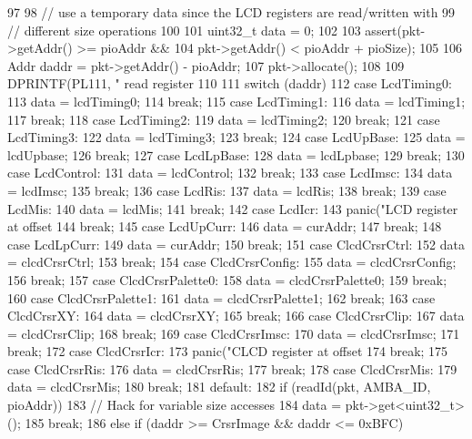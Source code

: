 \begin{DoxyCode}
97 {
98     // use a temporary data since the LCD registers are read/written with
99     // different size operations
100 
101     uint32_t data = 0;
102 
103     assert(pkt->getAddr() >= pioAddr &&
104            pkt->getAddr() < pioAddr + pioSize);
105 
106     Addr daddr = pkt->getAddr() - pioAddr;
107     pkt->allocate();
108 
109     DPRINTF(PL111, " read register %
110 
111     switch (daddr) {
112       case LcdTiming0:
113         data = lcdTiming0;
114         break;
115       case LcdTiming1:
116         data = lcdTiming1;
117         break;
118       case LcdTiming2:
119         data = lcdTiming2;
120         break;
121       case LcdTiming3:
122         data = lcdTiming3;
123         break;
124       case LcdUpBase:
125         data = lcdUpbase;
126         break;
127       case LcdLpBase:
128         data = lcdLpbase;
129         break;
130       case LcdControl:
131         data = lcdControl;
132         break;
133       case LcdImsc:
134         data = lcdImsc;
135         break;
136       case LcdRis:
137         data = lcdRis;
138         break;
139       case LcdMis:
140         data = lcdMis;
141         break;
142       case LcdIcr:
143         panic("LCD register at offset %
144         break;
145       case LcdUpCurr:
146         data = curAddr;
147         break;
148       case LcdLpCurr:
149         data = curAddr;
150         break;
151       case ClcdCrsrCtrl:
152         data = clcdCrsrCtrl;
153         break;
154       case ClcdCrsrConfig:
155         data = clcdCrsrConfig;
156         break;
157       case ClcdCrsrPalette0:
158         data = clcdCrsrPalette0;
159         break;
160       case ClcdCrsrPalette1:
161         data = clcdCrsrPalette1;
162         break;
163       case ClcdCrsrXY:
164         data = clcdCrsrXY;
165         break;
166       case ClcdCrsrClip:
167         data = clcdCrsrClip;
168         break;
169       case ClcdCrsrImsc:
170         data = clcdCrsrImsc;
171         break;
172       case ClcdCrsrIcr:
173         panic("CLCD register at offset %
174         break;
175       case ClcdCrsrRis:
176         data = clcdCrsrRis;
177         break;
178       case ClcdCrsrMis:
179         data = clcdCrsrMis;
180         break;
181       default:
182         if (readId(pkt, AMBA_ID, pioAddr)) {
183             // Hack for variable size accesses
184             data = pkt->get<uint32_t>();
185             break;
186         } else if (daddr >= CrsrImage && daddr <= 0xBFC) {
}}}
\end{DoxyCode}

